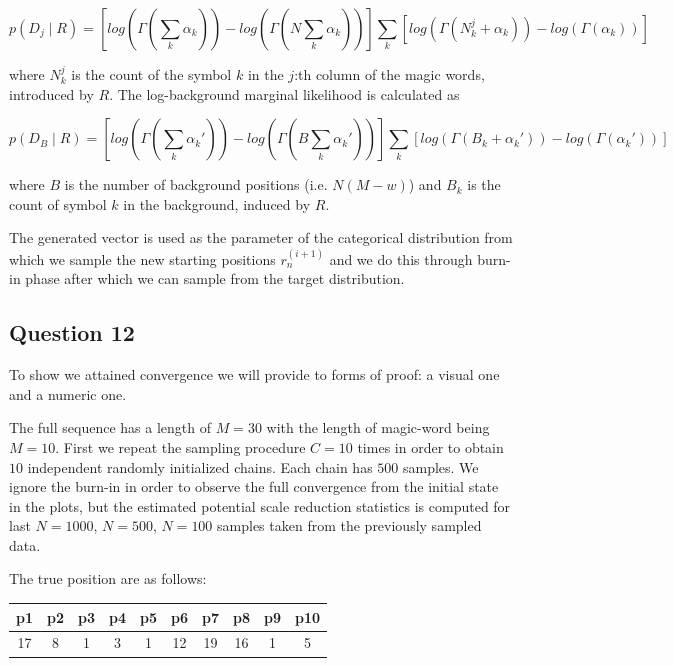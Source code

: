 \documentclass[]{article}
\begin{document}
	$$ p(D_j \mid R) = \left[log\left(\Gamma(\sum_k \alpha_k) \right) - log\left(\Gamma(N \sum_k \alpha_k)\right) \right] \sum_k \left[ log\left(\Gamma( N_k^j + \alpha_k)\right) - log\left(\Gamma(\alpha_k)\right) \right] $$
	
	where $N_k^j$ is the count of the symbol $k$ in the $j$:th column of the magic words, introduced by $R$. The log-background marginal likelihood is calculated as
	
	$$ p(D_B \mid R) = \left[ log\left(\Gamma(\sum_k \alpha_k') \right) - log\left(\Gamma(B \sum_k \alpha_k')\right) \right] \sum_k \left[ log\left(\Gamma( B_k + \alpha_k')\right) - log\left(\Gamma(\alpha_k') \right) \right] $$
	
	where $B$ is the number of background positions (i.e. $N(M-w)$) and $B_k$ is the count of symbol $k$ in the background, induced by $R$.
	
	
	The generated vector is used as the parameter of the categorical distribution from which we sample the new starting positions $r_n^{(i+1)}$ and we do this through burn-in phase after which we can sample from the target distribution.
	
	\subsection*{Question 12}
	
	To show we attained convergence we will provide to forms of proof: a visual one and a numeric one. 
	
	The full sequence has a length of $M=30$ with the length of magic-word being $M=10$. First we repeat the sampling procedure $C=10$ times in order to obtain $10$ independent randomly initialized chains. Each chain has $500$ samples. We ignore the burn-in in order to observe the full convergence from the initial state in the plots, but the estimated potential scale reduction statistics is computed for last $N=1000$, $N=500$, $N=100$ samples taken from the previously sampled data. 
	
	The true position are as follows:
	
	\begin{center}
		\begin{tabular}{||c c c c c c c c c c||} 
			\hline
			p1 & p2 & p3 & p4 & p5 & p6 & p7 & p8 & p9 & p10 \\ [0.5ex] 
			\hline\hline
			17 & 8 & 1 & 3 & 1 & 12 & 19 & 16 & 1 & 5 \\ [1ex]
			\hline
		\end{tabular}
	\end{center}
	
\end{document}

